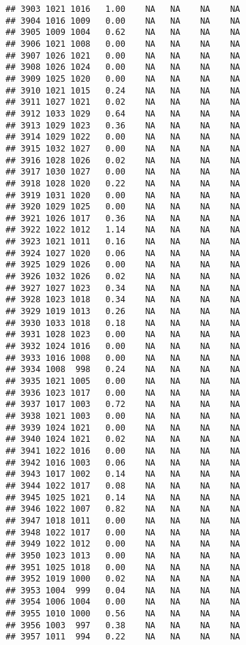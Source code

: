 \documentclass{article}\usepackage{graphicx, color}
\makeatletter
\newenvironment{kframe}{%
 \def\at@end@of@kframe{}%
 \ifinner\ifhmode%
  \def\at@end@of@kframe{\end{minipage}}%
  \begin{minipage}{\columnwidth}%
 \fi\fi%
 \def\FrameCommand##1{\hskip\@totalleftmargin \hskip-\fboxsep
 \colorbox{shadecolor}{##1}\hskip-\fboxsep
     \hskip-\linewidth \hskip-\@totalleftmargin \hskip\columnwidth}%
 \MakeFramed {\advance\hsize-\width
   \@totalleftmargin\z@ \linewidth\hsize
   \@setminipage}}%
 {\par\unskip\endMakeFramed%
 \at@end@of@kframe}
\newenvironment{knitrout}{}{} %
\makeatother
\begin{document}
\begin{knitrout}
\begin{kframe}
\begin{verbatim}
## 3903 1021 1016   1.00    NA   NA    NA    NA
## 3904 1016 1009   0.00    NA   NA    NA    NA
## 3905 1009 1004   0.62    NA   NA    NA    NA
## 3906 1021 1008   0.00    NA   NA    NA    NA
## 3907 1026 1021   0.00    NA   NA    NA    NA
## 3908 1026 1024   0.00    NA   NA    NA    NA
## 3909 1025 1020   0.00    NA   NA    NA    NA
## 3910 1021 1015   0.24    NA   NA    NA    NA
## 3911 1027 1021   0.02    NA   NA    NA    NA
## 3912 1033 1029   0.64    NA   NA    NA    NA
## 3913 1029 1023   0.36    NA   NA    NA    NA
## 3914 1029 1022   0.00    NA   NA    NA    NA
## 3915 1032 1027   0.00    NA   NA    NA    NA
## 3916 1028 1026   0.02    NA   NA    NA    NA
## 3917 1030 1027   0.00    NA   NA    NA    NA
## 3918 1028 1020   0.22    NA   NA    NA    NA
## 3919 1031 1020   0.00    NA   NA    NA    NA
## 3920 1029 1025   0.00    NA   NA    NA    NA
## 3921 1026 1017   0.36    NA   NA    NA    NA
## 3922 1022 1012   1.14    NA   NA    NA    NA
## 3923 1021 1011   0.16    NA   NA    NA    NA
## 3924 1027 1020   0.06    NA   NA    NA    NA
## 3925 1029 1026   0.00    NA   NA    NA    NA
## 3926 1032 1026   0.02    NA   NA    NA    NA
## 3927 1027 1023   0.34    NA   NA    NA    NA
## 3928 1023 1018   0.34    NA   NA    NA    NA
## 3929 1019 1013   0.26    NA   NA    NA    NA
## 3930 1033 1018   0.18    NA   NA    NA    NA
## 3931 1028 1023   0.00    NA   NA    NA    NA
## 3932 1024 1016   0.00    NA   NA    NA    NA
## 3933 1016 1008   0.00    NA   NA    NA    NA
## 3934 1008  998   0.24    NA   NA    NA    NA
## 3935 1021 1005   0.00    NA   NA    NA    NA
## 3936 1023 1017   0.00    NA   NA    NA    NA
## 3937 1017 1003   0.72    NA   NA    NA    NA
## 3938 1021 1003   0.00    NA   NA    NA    NA
## 3939 1024 1021   0.00    NA   NA    NA    NA
## 3940 1024 1021   0.02    NA   NA    NA    NA
## 3941 1022 1016   0.00    NA   NA    NA    NA
## 3942 1016 1003   0.06    NA   NA    NA    NA
## 3943 1017 1002   0.14    NA   NA    NA    NA
## 3944 1022 1017   0.08    NA   NA    NA    NA
## 3945 1025 1021   0.14    NA   NA    NA    NA
## 3946 1022 1007   0.82    NA   NA    NA    NA
## 3947 1018 1011   0.00    NA   NA    NA    NA
## 3948 1022 1017   0.00    NA   NA    NA    NA
## 3949 1022 1012   0.00    NA   NA    NA    NA
## 3950 1023 1013   0.00    NA   NA    NA    NA
## 3951 1025 1018   0.00    NA   NA    NA    NA
## 3952 1019 1000   0.02    NA   NA    NA    NA
## 3953 1004  999   0.04    NA   NA    NA    NA
## 3954 1006 1004   0.00    NA   NA    NA    NA
## 3955 1010 1000   0.56    NA   NA    NA    NA
## 3956 1003  997   0.38    NA   NA    NA    NA
## 3957 1011  994   0.22    NA   NA    NA    NA

\end{verbatim}
\end{kframe}
\end{knitrout}
\end{document}
